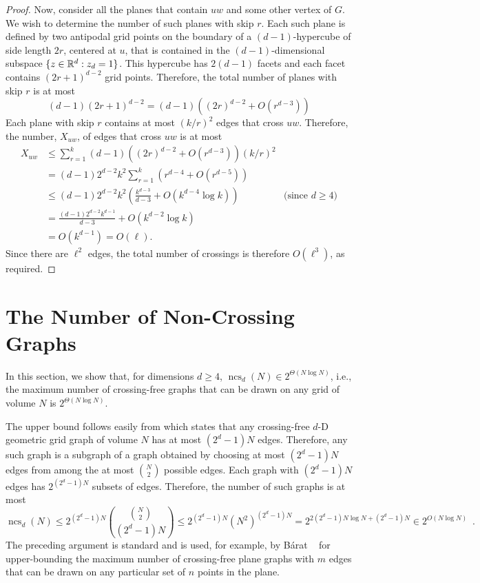 \documentclass[12pt]{article}
\newcommand{\n}{N}
\DeclareMathOperator{\ncs}{ncs}
\begin{document}
\begin{proof}
  Now, consider all the planes that contain $uw$ and some other vertex
  of $G$.  We wish to determine the number of such planes with skip $r$.
  Each such plane is defined by two antipodal grid points on the boundary
  of a $(d-1)$-hypercube of side length $2r$, centered at $u$, that is
  contained in the $(d-1)$-dimensional subspace $\{z\in\mathbb{R}^d:z_d=1\}$.
  This hypercube has $2(d-1)$ facets and each facet contains
  $(2r+1)^{d-2}$ grid points.  Therefore, the total number of planes with
  skip $r$ is at most
  \[
     (d-1)(2r+1)^{d-2} = (d-1)\left((2r)^{d-2} + O(r^{d-3})\right)
  \]
  Each plane with skip $r$ contains at most $(k/r)^2$ edges that cross
  $uw$.  Therefore, the number, $X_{uw}$, of edges that cross $uw$
  is at most
  \begin{align*}
     X_{uw} & \le \sum_{r=1}^k(d-1)\left((2r)^{d-2}+O(r^{d-3})\right)(k/r)^2 \\
         & = (d-1)2^{d-2}k^2\sum_{r=1}^k\left(r^{d-4} + O(r^{d-5})\right) \\
         & \le (d-1)2^{d-2}k^2\left(\frac{k^{d-3}}{d-3} 
             + O\left(k^{d-4}\log k\right)\right) 
               & \text{(since $d\ge 4$)} \\
         & = \frac{(d-1)2^{d-2}k^{d-1}}{d-3} + O(k^{d-2}\log k) \\
         & = O(k^{d-1}) = O(\ell).
  \end{align*}
  Since there are $\ell^2$ edges, the total number of crossings is
  therefore $O(\ell^3)$, as required.
\end{proof}

\section{The Number of Non-Crossing Graphs}

In this section, we show that, for dimensions $d\ge 4$, $\ncs_d(\n)\in
2^{\Theta(\n\log\n)}$, i.e., the maximum number of crossing-free graphs
that can be drawn on any grid of volume $\n$ is $2^{\Theta(\n\log\n)}$.

The upper bound follows easily from  which states that
any crossing-free $d$-D geometric grid graph of volume $\n$ has at
most $(2^d-1)\n$ edges.  Therefore, any such graph is a subgraph of a
graph obtained by choosing at most $(2^d-1)\n$ edges from among the at most
$\binom{\n}{2}$ possible edges.  Each graph with $(2^d-1)\n$ edges has
$2^{(2^d-1)\n}$ subsets of edges.  Therefore, the number of such graphs
is at most
\[
  \ncs_d(\n) \le 2^{(2^d-1)\n}\binom{\binom{\n}{2}}{(2^d-1)\n} 
      \le 2^{(2^d-1)\n} (\n^{2})^{(2^d-1)\n} 
      = 2^{2(2^d-1)\n\log\n+(2^d-1)\n} 
      \in 2^{O(\n\log\n)} \enspace .
\]
The preceding argument is standard and is used, for example, by B\'arat
\etal~\cite[Lemma~4]{barat.matousek.ea:bounded-degree} for upper-bounding
the maximum number of crossing-free plane graphs with $m$ edges that can
be drawn on any particular set of $n$ points in the plane.
\end{document}
